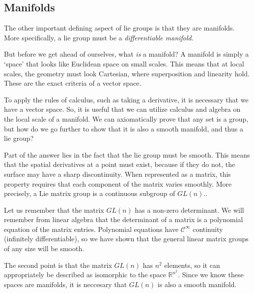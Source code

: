 \subsection{Manifolds}
The other important defining aspect of \glspl{lie group} is that they are manifolds. More specifically, a \gls{lie group} must be a \textit{differentiable manifold}. 

But before we get ahead of ourselves, what \textit{is} a manifold? A manifold is simply a `space' that looks like Euclidean space on small scales. This means that at local scales, the geometry must look Cartesian, where superposition and linearity hold. These are the exact criteria of a vector space.

To apply the rules of calculus, such as taking a derivative, it is necessary that we have a vector space. So, it is useful that we can utilize calculus and algebra on the local scale of a manifold. We can axiomatically prove that any set is a group, but how do we go further to show that it is also a smooth manifold, and thus a \gls{lie group}?

Part of the answer lies in the fact that the \gls{lie group} must be smooth. This means that the spatial derivatives at a point must exist, because if they do not, the surface may have a sharp discontinuity. When represented as a matrix, this property requires that each component of the matrix varies smoothly. More precisely, a Lie matrix group is a continuous subgroup of $GL(n)$.\cite{weiss_lie_nodate}.

\begin{example}
Let us remember that the matrix $GL(n)$ has a non-zero determinant. We will remember from linear algebra that the determinant of a matrix is a polynomial equation of the matrix entries. Polynomial equations have $\mathcal{C}^\infty$ continuity (infinitely differentiable), so we have shown that the general linear matrix groups of any size will be smooth.

The second point is that the matrix $GL(n)$ has $n^2$ elements, so it can appropriately be described as isomorphic to the space $\mathbb{R}^{n^2}$. Since we know these spaces are manifolds, it is neccesary that $GL(n)$ is also a smooth manifold.
\end{example}

